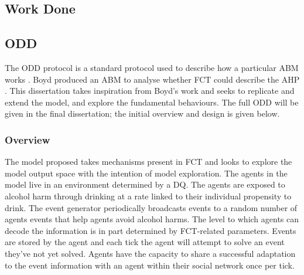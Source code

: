 

\subsection{Work Done}




\subsection{ODD}

The \ac{ODD} protocol is a standard protocol used to describe how a particular \ac{ABM} works \cite{oddOrigin}. Boyd produced an \ac{ABM} to analyse whether \ac{FCT} could describe the \ac{AHP} \cite{BoydphD}. This dissertation takes inspiration from Boyd's work and seeks to replicate and extend the model, and explore the fundamental behaviours. The full \ac{ODD} will be given in the final dissertation; the initial overview and design is given below.

\subsubsection{Overview}
The model proposed takes mechanisms present in \ac{FCT} and looks to explore the model output space with the intention of model exploration. The agents in the model live in an environment determined by a \ac{DQ}. The agents are exposed to alcohol harm through drinking at a rate linked to their individual propensity to drink. The event generator periodically broadcasts events to a random number of agents events that help agents avoid alcohol harms. The level to which agents can decode the information is in part determined by \ac{FCT}-related parameters. Events are stored by the agent and each tick the agent will attempt to solve an event they've not yet solved. Agents have the capacity to share a successful adaptation to the event information with an agent within their social network once per tick. 

